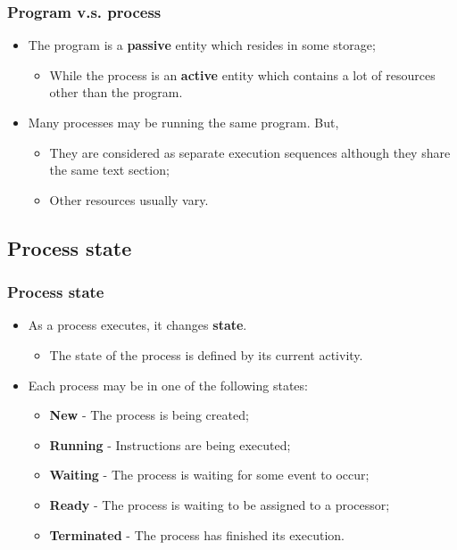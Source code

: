 \documentclass[CJKutf8,xcolor=pdftex,dvipsnames,table]{beamer}
\begin{document}
\begin{CJK*}{UTF8}{song}
  \begin{frame}
  \frametitle{Program v.s. process} \pause
  \begin{itemize}
  \item{The program is a \textbf{passive} entity which resides in some storage;} \pause
    \begin{itemize}
    \item{While the process is an \textbf{active} entity which contains a lot of resources other than the program.} \pause
    \end{itemize}
  \item{Many processes may be running the same program. But,} \pause
    \begin{itemize}
    \item{They are considered as separate execution sequences although they share the same text section;} \pause
    \item{Other resources usually vary.}
    \end{itemize}
  \end{itemize}
  \end{frame}

  \subsection{Process state}

  \begin{frame}
  \frametitle{Process state} \pause
  \begin{itemize}
  \item{As a process executes, it changes \textbf{state}.} \pause
    \begin{itemize}
    \item{The state of the process is defined by its current activity.} \pause
    \end{itemize}
  \item{Each process may be in one of the following states:} \pause
    \begin{itemize}
    \item{\textbf{New} \pause - The process is being created;} \pause
    \item{\textbf{Running} \pause - Instructions are being executed;} \pause
    \item{\textbf{Waiting} \pause - The process is waiting for some event to occur;} \pause
    \item{\textbf{Ready} \pause - The process is waiting to be assigned to a processor;} \pause
    \item{\textbf{Terminated} \pause - The process has finished its execution.}
    \end{itemize}
  \end{itemize}
  \end{frame}


\end{CJK*}
\end{document}
